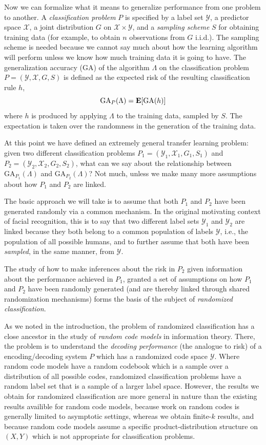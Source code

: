 Now we can formalize what it means to generalize performance from one
problem to another.  A \emph{classification problem} $P$ is specified
by a label set $\mathcal{Y}$, a predictor space $\mathcal{X}$, a joint
distribution $G$ on $\mathcal{X} \times \mathcal{Y}$, and a
\emph{sampling scheme} $S$ for obtaining training data (for example,
to obtain $n$ observations from $G$ i.i.d.).  The sampling scheme is
needed because we cannot say much about how the learning algorithm
will perform unless we know how much training data it is going to
have.  The generalization accuracy (GA) of the algorithm $\Lambda$ on the
classification problem $P = (\mathcal{Y}, \mathcal{X}, G, S)$ is
defined as the expected risk of the resulting classification rule $h$,
\[
\text{GA}_P(\Lambda) = \textbf{E}[\text{GA}(h)]
\]
where $h$ is produced by applying $\Lambda$ to the training data,
sampled by $S$.  The expectation is taken over the randomness in the
generation of the training data.

At this point we have defined an extremely general transfer learning
problem: given two different classification problems $P_1 =
(\mathcal{Y}_1, \mathcal{X}_1, G_1, S_1)$ and $P_2 = (\mathcal{Y}_2,
\mathcal{X}_2, G_2, S_2)$, what can we say about the relationship
between $\text{GA}_{P_1}(\Lambda)$ and $\text{GA}_{P_2}(\Lambda)$?
Not much, unless we make many more assumptions about how $P_1$ and
$P_2$ are linked.

The basic approach we will take is to assume that both $P_1$ and $P_2$
have been generated randomly via a common mechanism.  In the original
motivating context of facial recognition, this is to say that two
different label sets $\mathcal{Y}_1$ and $\mathcal{Y}_2$ are linked
because they both belong to a common population of labels
$\mathcal{Y}$, i.e., the population of all possible humans, and to
further assume that both have been \emph{sampled}, in the same manner,
from $\mathcal{Y}$.

The study of how to make inferences about the risk in $P_2$ given
information about the performance achieved in $P_1$, granted a set of
assumptions on how $P_1$ and $P_2$ have been randomly generated (and
are thereby linked through shared randomization mechanisms) forms the
basis of the subject of \emph{randomized classification}.

As we noted in the introduction, the problem of randomized
classification has a close ancestor in the study of \emph{random code
  models} in information theory.  There, the problem is to understand
the \emph{decoding performance} (the analogue to risk) of a
encoding/decoding system $P$ which has a randomized code space
$\mathcal{Y}$.  Where random code models have a random codebook which
is a sample over a distribution of all possible codes, randomized
classification problems have a random label set that is a sample of a
larger label space.  However, the results we obtain for randomized
classification are more general in nature than the existing results
availible for random code models, because work on random codes is
generally limited to asymptotic settings, whereas we obtain finite-$k$
results, and because random code models assume a specific
product-distribution structure on $(X, Y)$ which is not appropriate
for classification problems.

